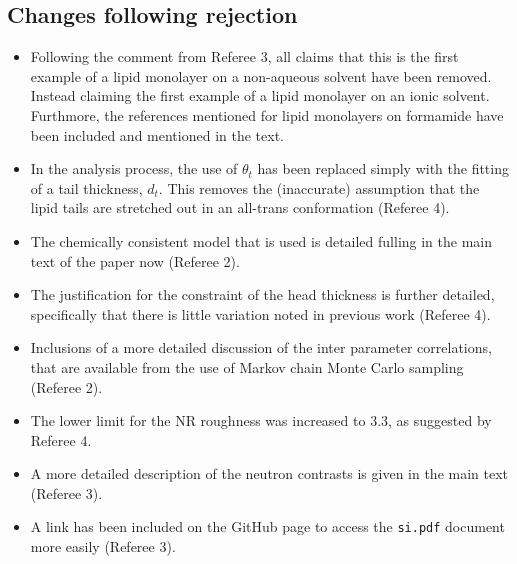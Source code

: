 \documentclass[amsmath,amssymb,twocolumn,superscriptaddress]{revtex4-1}
\begin{document}
\subsection{Changes following rejection}
\begin{itemize}
\item Following the comment from Referee 3, all claims that this is the first example of a lipid monolayer on a non-aqueous solvent have been removed. Instead claiming the first example of a lipid monolayer on an ionic solvent. Furthmore, the references mentioned for lipid monolayers on formamide have been included and mentioned in the text.
\item In the analysis process, the use of $\theta_t$ has been replaced simply with the fitting of a tail thickness, $d_t$. This removes the (inaccurate) assumption that the lipid tails are stretched out in an all-trans conformation (Referee 4).
\item The chemically consistent model that is used is detailed fulling in the main text of the paper now (Referee 2).
\item The justification for the constraint of the head thickness is further detailed, specifically that there is little variation noted in previous work (Referee 4).
\item Inclusions of a more detailed discussion of the inter parameter correlations, that are available from the use of Markov chain Monte Carlo sampling (Referee 2).
\item The lower limit for the NR roughness was increased to 3.3, as suggested by Referee 4.
\item A more detailed description of the neutron contrasts is given in the main text (Referee 3).
\item A link has been included on the GitHub page to access the \texttt{si.pdf} document more easily (Referee 3).
\end{itemize}
\end{document}
